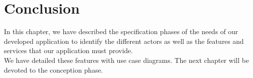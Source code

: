 \pagebreak
\section*{Conclusion}
In this chapter, we have described the specification phases of the
needs of our developed application to identify the different actors
as well as the features and services that our application must provide.\\
We have detailed these features with use case diagrams. The next chapter will be devoted to the conception phase.